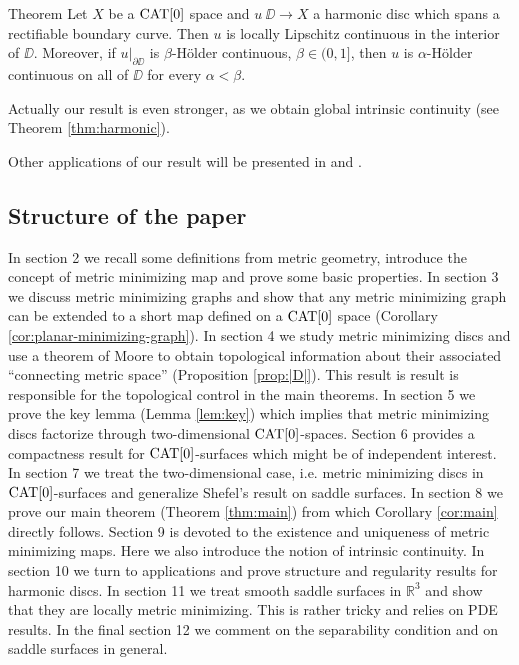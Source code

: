 \documentclass[a4paper,10pt]{amsart}
\begin{document}
\begin{thm}{Theorem}\label{thm:Lipregularityintro}
Let $X$ be a $\mathop{\rm CAT}\nolimits[0]$ space 
and $u\:\DD\to X$ a harmonic disc which spans a rectifiable boundary curve. 
Then $u$ is locally Lipschitz continuous in the interior of $\DD$. 
Moreover, if $u|_{\partial\DD}$ is $\beta$-H\"older continuous, $\beta\in(0,1]$, then $u$ is $\alpha$-H\"older continuous on all of
$\DD$ for every $\alpha<\beta$.
\end{thm}

Actually our result is even stronger, as we obtain global intrinsic continuity (see Theorem \ref{thm:harmonic}). 

Other applications of our result will be presented in \cite{LSW} and \cite{St}. 

\subsection{Structure of the paper}
In section 2 we recall some definitions from metric geometry, introduce the concept of metric minimizing map and prove some
basic properties. In section 3 we discuss metric minimizing graphs and show that any metric minimizing graph can be extended to a short
map defined on a $\mathop{\rm CAT}\nolimits[0]$ space (Corollary \ref{cor:planar-minimizing-graph}). In section 4 we study metric minimizing discs and
use a theorem of Moore \cite{moore} to obtain topological information about  their 
associated "`connecting metric space"' (Proposition \ref{prop:|D|}). This result is result is responsible for 
the topological control in the main theorems. In section 5 we prove the key lemma (Lemma \ref{lem:key}) which implies that 
metric minimizing discs factorize through two-dimensional $\mathop{\rm CAT}\nolimits[0]$-spaces. Section 6 provides a compactness result for $\mathop{\rm CAT}\nolimits[0]$-surfaces
which might be of independent interest. In section 7 we treat the two-dimensional case, i.e. metric minimizing discs
in $\mathop{\rm CAT}\nolimits[0]$-surfaces and generalize Shefel's result on saddle surfaces. In section 8 we prove our main theorem (Theorem \ref{thm:main})
from which Corollary \ref{cor:main} directly follows. Section 9 is devoted to the existence and uniqueness of metric minimizing maps.
Here we also introduce the notion of intrinsic continuity. In section 10 we turn to applications and prove structure and regularity results
for harmonic discs. In section 11 we treat smooth saddle surfaces in $\mathbb{R}^3$ and show that they are locally metric minimizing.
This is rather tricky and relies on PDE results. In the final section 12 we comment on the separability condition and on saddle 
surfaces in general.
\end{document}
